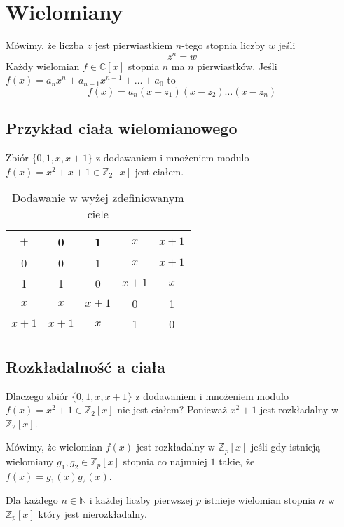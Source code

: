 \documentclass{../notatki}
\begin{document}
\section{Wielomiany}

Mówimy, że liczba $z$ jest pierwiastkiem $n$-tego stopnia liczby $w$ jeśli
$$
z^n = w
$$
Każdy wielomian $f \in \mathbb{C}[x]$ stopnia $n$ ma $n$
pierwiastków. Jeśli $f(x) = a_n x^n + a_{n-1} x^{n-1} + \dots + a_0$ to
$$
f(x) = a_n (x - z_1)(x - z_2) \dots (x - z_n)
$$

\subsection{Przykład ciała wielomianowego}

Zbiór $\{0, 1, x, x+1\}$ z dodawaniem i mnożeniem modulo $f(x) = x^2
+ x + 1 \in \mathbb{Z}_2[x]$ jest ciałem.

\begin{table*}[h]
  \centering
  \begin{tabular}{c|cccc}
    \hline
    $+$ & 0 & 1 & $x$ & $x + 1$ \\
    \hline
    0 & 0 & 1 & $x$ & $x + 1$ \\
    1 & 1 & 0 & $x + 1$ & $x$ \\
    $x$ & $x$ & $x + 1$ & 0 & 1 \\
    $x + 1$ & $x + 1$ & $x$ & 1 & 0 \\
    \hline
  \end{tabular}
  \caption{Dodawanie w wyżej zdefiniowanym ciele}
\end{table*}

\subsection{Rozkładalność a ciała}

Dlaczego zbiór $\{0, 1, x, x + 1\}$ z dodawaniem i mnożeniem modulo
$f(x) = x^2 + 1 \in \mathbb{Z}_2[x]$ nie jest ciałem? Ponieważ $x^2 +
1$ jest rozkładalny w $\mathbb{Z}_2[x]$.

Mówimy, że wielomian $f(x)$ jest rozkładalny w $\mathbb{Z}_p[x]$
jeśli gdy istnieją
wielomiany $g_1, g_2 \in \mathbb{Z}_p[x]$ stopnia co najmniej $1$ takie, że
$f(x) = g_1(x)g_2(x)$.

Dla każdego $n \in \mathbb{N}$ i każdej liczby pierwszej $p$ istnieje wielomian
stopnia $n$ w $\mathbb{Z}_p[x]$ który jest nierozkładalny.
\end{document}
